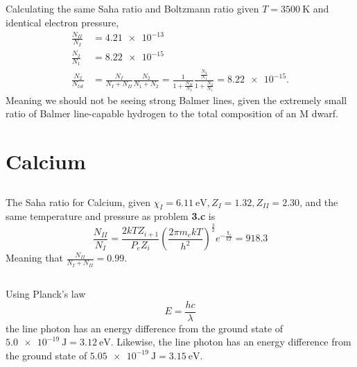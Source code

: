 \documentclass{article}
\begin{document}
\subsection{}

Calculating the same Saha ratio and Boltzmann ratio given \(T = \SI{3500}{\kelvin}\) and identical electron pressure,
\begin{align}
    \frac{N_{II}}{N_I} &= \num{4.21e-13} \\
    \frac{N_2}{N_1} &= \num{8.22e-15} \\
    \frac{N_2}{N_{tot}} &= \frac{N_I}{N_I + N_{II}} \frac{N_2}{N_1 + N_2} = \frac{1}{1 + \frac{N_{II}}{N_I}} \frac{\frac{N_2}{N_1}}{1 + \frac{N_2}{N_1}} = \num{8.22e-15}.
\end{align}
Meaning we should not be seeing strong Balmer lines, given the extremely small ratio of Balmer line-capable hydrogen to the total composition of an M dwarf.

\section{Calcium}

\subsection{}

The Saha ratio for Calcium, given \(\chi_I = \SI{6.11}{\electronvolt}, Z_I = \num{1.32}, Z_{II} = \num{2.30}\), and the same temperature and pressure as problem \textbf{3.c} is
\begin{equation}
    \frac{N_{II}}{N_I} = \frac{2 kT Z_{i + 1}}{P_e Z_i} \left(\frac{2 \pi m_e kT}{h^2}\right)^{\frac{3}{2}} e^{-\frac{\chi_i}{kT}} = \num{918.3}
\end{equation}
Meaning that \(\frac{N_{II}}{N_I + N_{II}} = \num{0.99}\).

\subsection{}

Using Planck's law
\begin{equation}
    E = \frac{h c}{\lambda}
\end{equation}
the  line photon has an energy difference from the ground state of \(\SI{5.0e-19}{\joule} = \SI{3.12}{\electronvolt}\).
Likewise, the  line photon has an energy difference from the ground state of \(\SI{5.05e-19}{\joule} = \SI{3.15}{\electronvolt}\).
\end{document}
